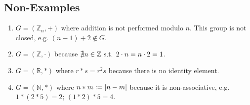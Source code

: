 \subsection{Non-Examples}
\begin{enumerate}
	\item \(G = (\mathbb Z_n, +)\) where addition is not performed modulo \(n\).
	      This group is not closed, e.g.
	      \((n-1) + 2 \notin G\).
	\item \(G = (\mathbb Z, \cdot)\) because \(\nexists n\in \mathbb Z \text{ s.t. } 2 \cdot n = n \cdot 2 = 1\).
	\item \(G = (\mathbb R, \ast)\) where \(r \ast s = r^2 s\) because there is no identity element.
	\item \(G = (\mathbb N, \ast)\) where \(n \ast m := \abs{n - m}\) because it is non-associative, e.g.
	      \(1 \ast (2 \ast 5) = 2\); \((1 \ast 2) \ast 5 = 4\).
\end{enumerate}
